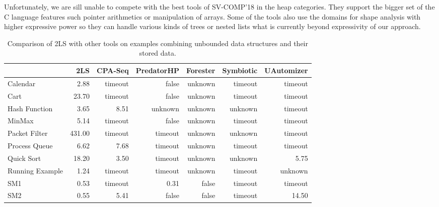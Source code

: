 {Unfortunately, we are sill unable to compete with the best tools of SV-COMP'18 in the heap categories.
They support the bigger set of the C language features such pointer arithmetics or
manipulation of arrays.
Some of the tools also use the domains for shape analysis with higher expressive power
so they can handle various kinds of trees or nested lists what is currently beyond expressivity
of our approach.

\begin{table}[t]
\captionsetup{font=small}
\caption{Comparison of 2LS with other tools on examples combining unbounded data structures and their stored data.}
\vspace*{-1mm}
\label{tab:others}
\centering
\scriptsize
\bgroup
\def\arraystretch{1.2}
\begin{tabular}{|l| g | r | r | r | r | r |}
\hline
& \textbf{2LS}  & \textbf{CPA-Seq } & \textbf{PredatorHP} & \textbf{Forester}  & \textbf{Symbiotic} & \textbf{UAutomizer}  \\\hline
Calendar          & 2.88   & timeout & false   & unknown  & timeout  & timeout  \\\hline
Cart              & 23.70  & timeout & false   & unknown  & timeout  & timeout  \\\hline
Hash Function     & 3.65   & 8.51    & unknown & unknown  & unknown  & timeout  \\\hline
MinMax            & 5.14   & timeout & false   & unknown  & timeout  & timeout  \\\hline
Packet Filter     & 431.00 & timeout & timeout & unknown  & unknown  & timeout  \\\hline
Process Queue     & 6.62   & 7.68    & timeout & unknown  & timeout  & timeout  \\\hline
Quick Sort        & 18.20  & 3.50    & timeout & unknown  & unknown  & 5.75     \\\hline
Running Example   & 1.24   & timeout & timeout & unknown  & timeout  & unknown  \\\hline
SM1               & 0.53   & timeout & 0.31    & false    & timeout  & timeout  \\\hline
SM2               & 0.55   & 5.41    & false   & false    & timeout  & 14.50    \\\hline
\end{tabular}
\egroup
\vspace{-1.5em}
\end{table}

}
